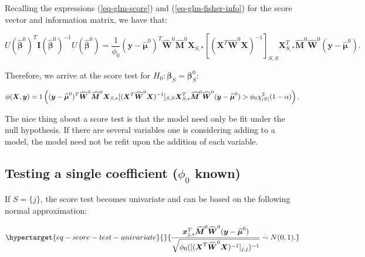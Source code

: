 \documentclass[
  11pt,
  letterpaper,
  oneside]{book}
\theoremstyle{definition}
\theoremstyle{plain}
\theoremstyle{plain}
\theoremstyle{plain}
\theoremstyle{remark}
\begin{document}
Recalling the expressions (\ref{eq-glm-score}) and
(\ref{eq-glm-fisher-info}) for the score vector and information matrix,
we have that:

\[
U(\boldsymbol{\widehat{\beta}}^0)^T \boldsymbol{I}(\boldsymbol{\widehat{\beta}}^0)^{-1} U(\boldsymbol{\widehat{\beta}}^0) = \frac{1}{\phi_0}(\boldsymbol{y} - \boldsymbol{\widehat{\mu}}^0)^T \boldsymbol{\widehat{W}}^0 \boldsymbol{\widehat{M}}^0 \boldsymbol{X}_{S,*}[(\boldsymbol{X}^T \boldsymbol{\widehat{W}}^0 \boldsymbol{X})^{-1}]_{S,S} \boldsymbol{X}_{S,*}^T \boldsymbol{\widehat{M}}^0 \boldsymbol{\widehat{W}}^0 (\boldsymbol{y} - \boldsymbol{\widehat{\mu}}^0).
\]

Therefore, we arrive at the score test for
\(H_0: \boldsymbol{\beta}_S = \boldsymbol{\beta}_S^0\):

\[
\small
\phi(\boldsymbol{X}, \boldsymbol{y}) = 1\left((\boldsymbol{y} - \boldsymbol{\widehat{\mu}}^0)^T \boldsymbol{\widehat{W}}^0 \boldsymbol{\widehat{M}}^0 \boldsymbol{X}_{S,*}[(\boldsymbol{X}^T \boldsymbol{\widehat{W}}^0 \boldsymbol{X})^{-1}]_{S,S} \boldsymbol{X}_{S,*}^T \boldsymbol{\widehat{M}}^0 \boldsymbol{\widehat{W}}^0 (\boldsymbol{y} - \boldsymbol{\widehat{\mu}}^0) > \phi_0 \chi^2_{|S|}(1-\alpha)\right).
\]

The nice thing about a score test is that the model need only be fit
under the null hypothesis. If there are several variables one is
considering adding to a model, the model need not be refit upon the
addition of each variable.

\hypertarget{sec-score-test-single-coeff}{%
\subsection{\texorpdfstring{Testing a single coefficient (\(\phi_0\)
known)}{Testing a single coefficient (\textbackslash phi\_0 known)}}\label{sec-score-test-single-coeff}}

If \(S = \{j\}\), the score test becomes univariate and can be based on
the following normal approximation:

\begin{equation}\protect\hypertarget{eq-score-test-univariate}{}{
\frac{\boldsymbol{x}_{j,*}^T \boldsymbol{\widehat{M}}^0 \boldsymbol{\widehat{W}}^0 (\boldsymbol{y} - \boldsymbol{\widehat{\mu}}^0)}{\sqrt{\phi_0 ([(\boldsymbol{X}^T \boldsymbol{\widehat{W}}^0 \boldsymbol{X})^{-1}]_{j, j})^{-1}}} \overset{\cdot}{\sim} N(0, 1).
}\label{eq-score-test-univariate}\end{equation}
\end{document}
